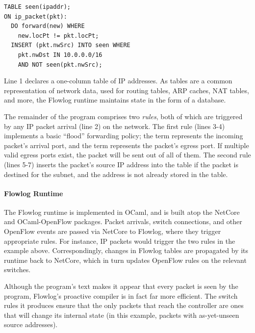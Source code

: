 \begin{lstlisting}[label=lst:flowlog-intro,language=Flowlog]
TABLE seen(ipaddr);
ON ip_packet(pkt):
  DO forward(new) WHERE
    new.locPt != pkt.locPt;
  INSERT (pkt.nwSrc) INTO seen WHERE
    pkt.nwDst IN 10.0.0.0/16 
    AND NOT seen(pkt.nwSrc);
\end{lstlisting}

\noindent
Line 1 declares a one-column table of IP addresses. As tables are a common
representation of network data, used for routing tables, ARP caches, NAT tables,
and more, the Flowlog runtime maintains state in the form of a database.

The remainder of the program comprises two \emph{rules}, both of which are
triggered by any IP packet arrival (line 2) on the network. The first rule (lines 3-4)
implements a basic ``flood'' forwarding policy; the  term
represents the incoming packet's arrival port, and the  term
represents the packet's egress port. If multiple valid egress ports exist, the
packet will be sent out of all of them. The second rule (lines 5-7) inserts the
packet's source IP address into the table if the packet is destined for the
 subnet, and the address is not already stored in the table.

\paragraph{Flowlog Runtime}

The Flowlog runtime is implemented in OCaml, and is built atop the
NetCore and OCaml-OpenFlow packages. Packet arrivals, switch
connections, and other OpenFlow events are passed via NetCore to
Flowlog, where they trigger appropriate rules. For instance, IP
packets would trigger the two rules in the example above.
Correspondingly, changes in Flowlog tables are propagated by its
runtime back to NetCore, which in turn updates OpenFlow rules on the
relevant switches.

Although the program's text makes it appear that every packet is seen by the
program, Flowlog's proactive compiler is in fact far more efficient. The
switch rules it produces ensure that the only packets that reach the controller are ones that will
change its internal state (in this example, packets with
as-yet-unseen source addresses).



